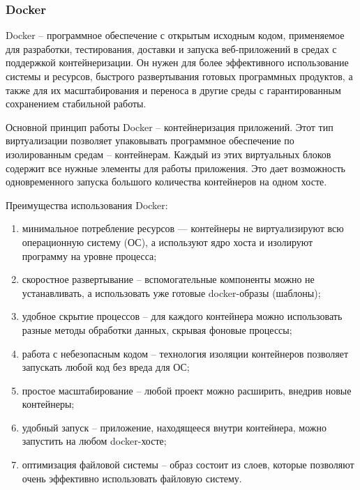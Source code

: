 \subsubsection{Docker}
	
Docker -- программное обеспечение с открытым исходным кодом, применяемое для разработки, тестирования, доставки и запуска веб-приложений в средах с поддержкой контейнеризации. Он нужен для более эффективного использование системы и ресурсов, быстрого развертывания готовых программных продуктов, а также для их масштабирования и переноса в другие среды с гарантированным сохранением стабильной работы.
	
Основной принцип работы Docker -- контейнеризация приложений. Этот тип виртуализации позволяет упаковывать программное обеспечение по изолированным средам -- контейнерам. Каждый из этих виртуальных блоков содержит все нужные элементы для работы приложения. Это дает возможность одновременного запуска большого количества контейнеров на одном хосте.
	
Преимущества использования Docker:
\begin{enumerate}
	\item минимальное потребление ресурсов — контейнеры не виртуализируют всю операционную систему (ОС), а используют ядро хоста и изолируют программу на уровне процесса;
	\item скоростное развертывание -- вспомогательные компоненты можно не устанавливать, а использовать уже готовые docker-образы (шаблоны);
	\item удобное скрытие процессов -- для каждого контейнера можно использовать разные методы обработки данных, скрывая фоновые процессы;
	\item работа с небезопасным кодом -- технология изоляции контейнеров позволяет запускать любой код без вреда для ОС;
	\item простое масштабирование -- любой проект можно расширить, внедрив новые контейнеры;
	\item удобный запуск -- приложение, находящееся внутри контейнера, можно запустить на любом docker-хосте;
	\item оптимизация файловой системы -- образ состоит из слоев, которые позволяют очень эффективно использовать файловую систему.
\end{enumerate}
	
